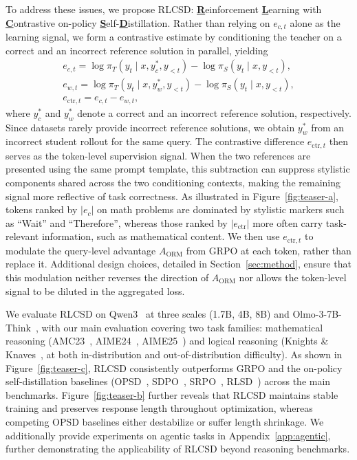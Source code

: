 To address these issues, we propose \textsc{RLCSD}: \textbf{\underline{R}}einforcement \textbf{\underline{L}}earning with \textbf{\underline{C}}ontrastive on-policy \textbf{\underline{S}}elf-\textbf{\underline{D}}istillation. Rather than relying on $e_{c,t}$ alone as the learning signal, we form a contrastive estimate by conditioning the teacher on a correct and an incorrect reference solution in parallel, yielding
\begin{gather}
e_{c,t} = \log \pi_T(y_t \mid x, y_c^*, y_{<t}) - \log \pi_S(y_t \mid x, y_{<t}), \\
e_{w,t} = \log \pi_T(y_t \mid x, y_w^*, y_{<t}) - \log \pi_S(y_t \mid x, y_{<t}), \\
e_{\text{ctr},t} = e_{c,t} - e_{w,t},
\end{gather}
where $y_c^*$ and $y_w^*$ denote a correct and an incorrect reference solution, respectively. Since datasets rarely provide incorrect reference solutions, we obtain $y_w^*$ from an incorrect student rollout for the same query. The contrastive difference $e_{\text{ctr},t}$ then serves as the token-level supervision signal. When the two references are presented using the same prompt template, this subtraction can suppress stylistic components shared across the two conditioning contexts, making the remaining signal more reflective of task correctness. As illustrated in Figure~\ref{fig:teaser-a}, tokens ranked by $|e_c|$ on math problems are dominated by stylistic markers such as ``Wait'' and ``Therefore'', whereas those ranked by $|e_{\text{ctr}}|$ more often carry task-relevant information, such as mathematical content. We then use $e_{\text{ctr},t}$ to modulate the query-level advantage $A_\mathrm{ORM}$ from GRPO at each token, rather than replace it. Additional design choices, detailed in Section~\ref{sec:method}, ensure that this modulation neither reverses the direction of $A_\mathrm{ORM}$ nor allows the token-level signal to be diluted in the aggregated loss.


We evaluate RLCSD on Qwen3~\citep{yang2025qwen3} at three scales (1.7B, 4B, 8B) and Olmo-3-7B-Think~\citep{olmo2025olmo3}, with our main evaluation covering two task families: mathematical reasoning (AMC23~\citep{amc23}, AIME24~\citep{aime24}, AIME25~\citep{aime25}) and logical reasoning (Knights \& Knaves~\citep{xie2025logic}, at both in-distribution and out-of-distribution difficulty). As shown in Figure~\ref{fig:teaser-c}, RLCSD consistently outperforms GRPO and the on-policy self-distillation baselines (OPSD~\citep{zhao2026self}, SDPO~\citep{hubotter2026reinforcement}, SRPO~\citep{li2026unifying}, RLSD~\citep{yang2026self}) across the main benchmarks. Figure~\ref{fig:teaser-b} further reveals that RLCSD maintains stable training and preserves response length throughout optimization, whereas competing OPSD baselines either destabilize or suffer length shrinkage. We additionally provide experiments on agentic tasks in Appendix~\ref{app:agentic}, further demonstrating the applicability of RLCSD beyond reasoning benchmarks.

